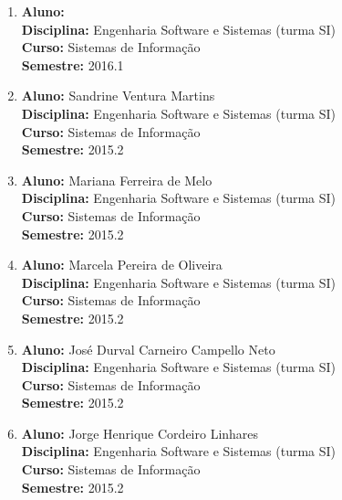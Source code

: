 \documentclass[a4paper,oneside,10pt]{article}
\begin{document}
\begin{enumerate}
\renewcommand{\labelenumi}{{\large\bfseries\arabic{enumi}.}}

\item   \textbf{Aluno:}  \mbox{} \\
        \textbf{Disciplina:}  Engenharia Software e Sistemas (turma SI)\\
        \textbf{Curso:} Sistemas de Informação\\
        \textbf{Semestre:} 2016.1

\item   \textbf{Aluno:} Sandrine Ventura Martins \mbox{} \\
        \textbf{Disciplina:}  Engenharia Software e Sistemas (turma SI)\\
        \textbf{Curso:} Sistemas de Informação\\
        \textbf{Semestre:} 2015.2

\item   \textbf{Aluno:} Mariana Ferreira de Melo \mbox{} \\
        \textbf{Disciplina:}  Engenharia Software e Sistemas (turma SI)\\
        \textbf{Curso:} Sistemas de Informação\\
        \textbf{Semestre:} 2015.2

\item   \textbf{Aluno:} Marcela Pereira de Oliveira \mbox{} \\
        \textbf{Disciplina:}  Engenharia Software e Sistemas (turma SI)\\
        \textbf{Curso:} Sistemas de Informação\\
        \textbf{Semestre:} 2015.2

\item   \textbf{Aluno:} José Durval Carneiro Campello Neto \mbox{} \\
        \textbf{Disciplina:}  Engenharia Software e Sistemas (turma SI)\\
        \textbf{Curso:} Sistemas de Informação\\
        \textbf{Semestre:} 2015.2

\item   \textbf{Aluno:} Jorge Henrique Cordeiro Linhares \mbox{} \\
        \textbf{Disciplina:}  Engenharia Software e Sistemas (turma SI)\\
        \textbf{Curso:} Sistemas de Informação\\
        \textbf{Semestre:} 2015.2


\end{enumerate}
\end{document}
